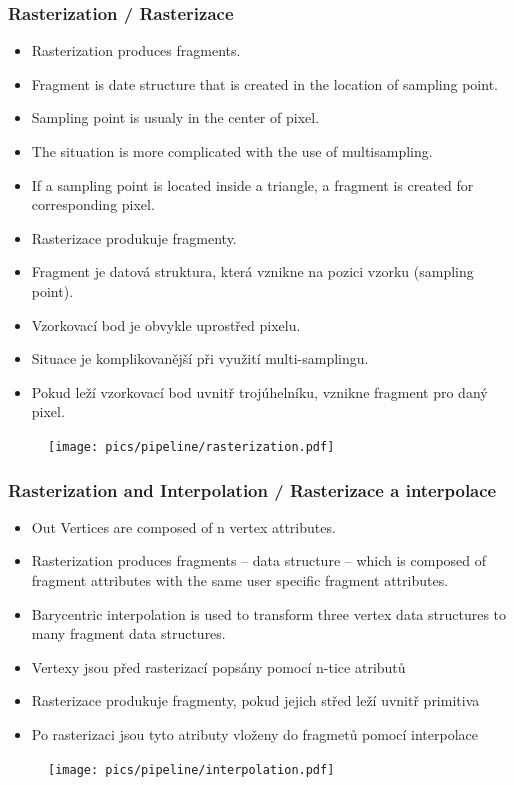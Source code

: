 \begin{frame}
\frametitle{Rasterization / Rasterizace}
  \scriptsize
	\begin{itemize}
		\item Rasterization produces fragments.
    \item Fragment is date structure that is created in the location of sampling point.
    \item Sampling point is usualy in the center of pixel.
    \item The situation is more complicated with the use of multisampling.
    \item If a sampling point is located inside a triangle, a fragment is created for corresponding pixel.
	\end{itemize}
	\begin{itemize}
		\item Rasterizace produkuje fragmenty.
    \item Fragment je datová struktura, která vznikne na pozici vzorku (sampling point).
    \item Vzorkovací bod je obvykle uprostřed pixelu.
    \item Situace je komplikovanější při využití multi-samplingu.
    \item Pokud leží vzorkovací bod uvnitř trojúhelníku, vznikne fragment pro daný pixel.
	\end{itemize}
	\begin{figure}[h]
		\texttt{[image: pics/pipeline/rasterization.pdf]}
	\end{figure}
\end{frame}

\begin{frame}
\frametitle{Rasterization and Interpolation / Rasterizace a interpolace}
  \scriptsize
	\begin{itemize}
		\item Out Vertices are composed of n vertex attributes.
    \item Rasterization produces fragments -- data structure -- which is composed of fragment attributes with the same user specific fragment attributes.
    \item Barycentric interpolation is used to transform three vertex data structures to many fragment data structures.
	\end{itemize}
	\begin{itemize}
		\item Vertexy jsou před rasterizací popsány pomocí n-tice atributů
    \item Rasterizace produkuje fragmenty, pokud jejich střed leží uvnitř primitiva
    \item Po rasterizaci jsou tyto atributy vloženy do fragmetů pomocí interpolace
	\end{itemize}
	\begin{figure}[h]
		\texttt{[image: pics/pipeline/interpolation.pdf]}
	\end{figure}
\end{frame}

